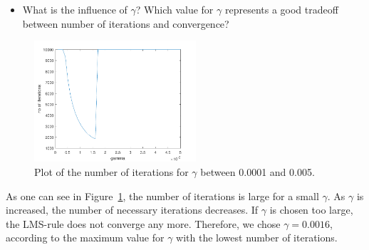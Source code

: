 \documentclass[a4]{article}
\begin{document}
\begin{itemize}	
	\item What is the influence of $\gamma$? Which value for $\gamma$ represents a good tradeoff between number of iterations and convergence? 
\end{itemize}
\begin{figure}[!h]
	\begin{center}
		\centering
		\includegraphics[width=6cm]{../figures/bestGamma.pdf}
	\end{center}
	\caption{\label{fig:bestGamma} Plot of the number of iterations for $\gamma$ between 0.0001 and 0.005.}
\end{figure}
As one can see in Figure~\ref{fig:bestGamma}, the number of iterations is large for a small $\gamma$. As $\gamma$ is increased, the number of necessary iterations decreases. If $\gamma$ is chosen too large, the LMS-rule does not converge any more.
Therefore, we chose $\gamma=0.0016$, according to the maximum value for $\gamma$  with the lowest number of iterations. 
\end{document}

